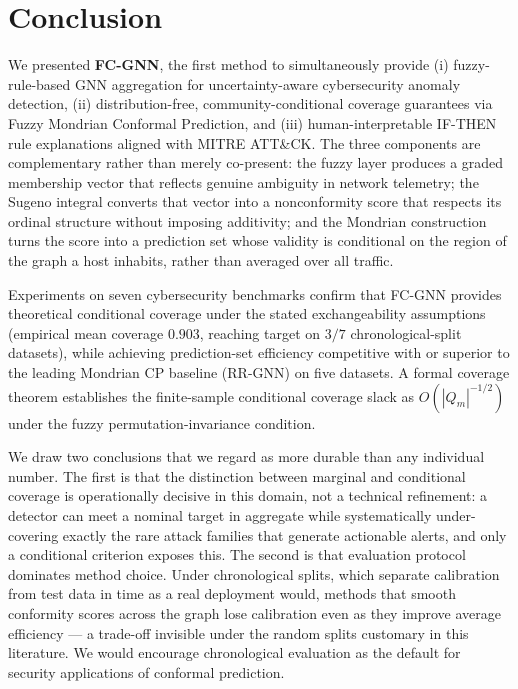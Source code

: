 \section{Conclusion}
\label{sec:conclusion}

We presented \textbf{FC-GNN}, the first method to simultaneously provide
(i) fuzzy-rule-based GNN aggregation for uncertainty-aware cybersecurity
anomaly detection, (ii) distribution-free, community-conditional coverage
guarantees via Fuzzy Mondrian Conformal Prediction, and (iii) human-interpretable
IF-THEN rule explanations aligned with MITRE ATT\&CK.
The three components are complementary rather than merely co-present: the fuzzy
layer produces a graded membership vector that reflects genuine ambiguity in
network telemetry; the Sugeno integral converts that vector into a nonconformity
score that respects its ordinal structure without imposing additivity; and the
Mondrian construction turns the score into a prediction set whose validity is
conditional on the region of the graph a host inhabits, rather than averaged
over all traffic.

Experiments on seven cybersecurity benchmarks confirm that FC-GNN provides theoretical
conditional coverage under the stated exchangeability assumptions (empirical mean
coverage $0.903$, reaching target on $3/7$ chronological-split datasets), while achieving
prediction-set efficiency competitive with or superior to the leading Mondrian CP baseline
(RR-GNN) on five datasets.
A formal coverage theorem establishes the finite-sample conditional
coverage slack as $O(|Q_m|^{-1/2})$ under the fuzzy permutation-invariance
condition.

We draw two conclusions that we regard as more durable than any individual
number. The first is that the distinction between marginal and conditional
coverage is operationally decisive in this domain, not a technical refinement: a
detector can meet a nominal target in aggregate while systematically
under-covering exactly the rare attack families that generate actionable alerts,
and only a conditional criterion exposes this. The second is that evaluation
protocol dominates method choice. Under chronological splits, which separate
calibration from test data in time as a real deployment would, methods that
smooth conformity scores across the graph lose calibration even as they improve
average efficiency — a trade-off invisible under the random splits customary in
this literature. We would encourage chronological evaluation as the default for
security applications of conformal prediction.

